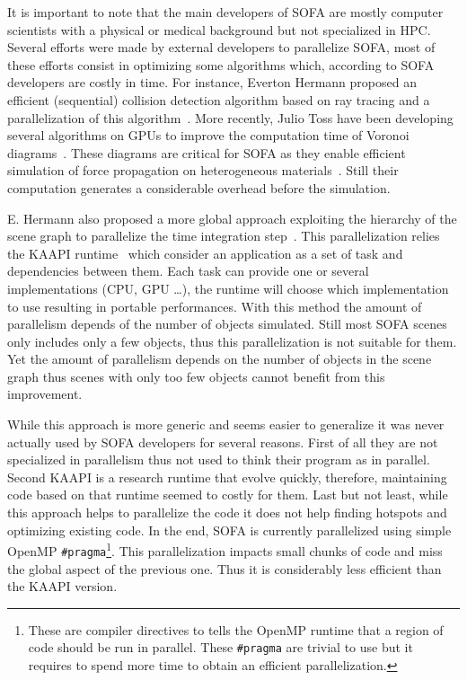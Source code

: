It is important to note that the main developers of \gls{SOFA} are  mostly computer scientists with a physical or medical background but not specialized in \gls{HPC}.
Several efforts were made by external developers to parallelize \gls{SOFA}, most of these efforts consist in optimizing some algorithms which, according to \gls{SOFA} developers are costly in time.
For instance, Everton Hermann proposed an efficient (sequential) collision detection algorithm based on ray tracing and a parallelization of this algorithm~\cite{Hermann08Raytraced}.
More recently, Julio Toss have been developing several algorithms on \glspl{GPU} to improve the computation time of Voronoi diagrams~\cite{Toss13Parallel,Toss14Parallel}.
These diagrams are critical for \gls{SOFA} as they enable efficient simulation of force propagation on heterogeneous materials~\cite{Faure11Sparse}.
Still their computation generates a considerable overhead before the simulation.

E. Hermann also proposed a more global approach exploiting the hierarchy of the scene graph to parallelize the time integration step~\cite{Hermann09Interactive}.
This parallelization relies the \gls{KAAPI} runtime~\cite{Gautier07KAAPI} which consider an application as a set of task and dependencies between them.
Each task can provide one or several implementations (\gls{CPU}, \gls{GPU} \ldots), the runtime will choose which implementation to use resulting in portable performances.
With this method the amount of parallelism depends of the number of objects simulated.
Still most \gls{SOFA} scenes only includes only a few objects, thus this parallelization is not suitable for them.
Yet the amount of parallelism depends on the number of objects in the scene graph thus scenes with only too few objects cannot benefit from this improvement.


While this approach is more generic and seems easier to generalize it was never actually used by \gls{SOFA} developers for several reasons.
First of all they are not specialized in parallelism thus not used to think their program as in parallel.
Second \gls{KAAPI} is a research runtime that evolve quickly, therefore, maintaining code based on that runtime seemed to costly for them.
Last but not least, while this approach helps to parallelize the code it does not help finding hotspots and optimizing existing code.
In the end, \gls{SOFA} is currently parallelized using simple \gls{OpenMP} \texttt{\#pragma}\footnote{
    These are compiler directives to tells the \gls{OpenMP} runtime that a region of code should be run in parallel.
    These \texttt{#pragma} are trivial to use but it requires to spend more time to obtain an efficient parallelization.}.
This parallelization impacts small chunks of code and miss the global aspect of the previous one.
Thus it is considerably less efficient than the \gls{KAAPI} version.

